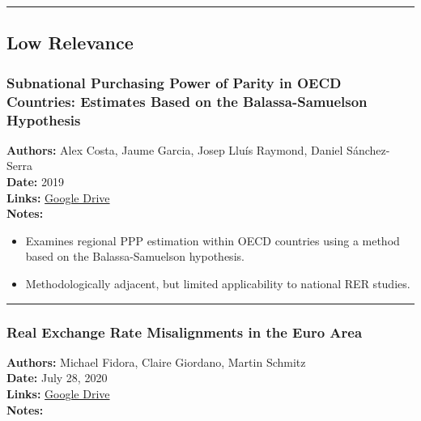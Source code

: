\documentclass[
  11pt,
]{article}
\providecommand{\tightlist}{%
  \setlength{\itemsep}{0pt}\setlength{\parskip}{0pt}}
\begin{document}
\begin{center}\rule{0.5\linewidth}{0.5pt}\end{center}

\subsection{Low Relevance}\label{low-relevance}

\subsubsection{Subnational Purchasing Power of Parity in OECD Countries:
Estimates Based on the Balassa-Samuelson
Hypothesis}\label{subnational-purchasing-power-of-parity-in-oecd-countries-estimates-based-on-the-balassa-samuelson-hypothesis}

\textbf{Authors:} Alex Costa, Jaume Garcia, Josep Lluís Raymond, Daniel
Sánchez-Serra\\
\textbf{Date:} 2019\\
\textbf{Links:}
\href{https://drive.google.com/file/d/1QT0iR2TwIY5ayraL7pAe0Ir_R03U17nR/view?usp=sharing}{Google
Drive}\\
\textbf{Notes:}

\begin{itemize}
\tightlist
\item
  Examines regional PPP estimation within OECD countries using a method
  based on the Balassa-Samuelson hypothesis.
\item
  Methodologically adjacent, but limited applicability to national RER
  studies.
\end{itemize}

\begin{center}\rule{0.5\linewidth}{0.5pt}\end{center}

\subsubsection{Real Exchange Rate Misalignments in the Euro
Area}\label{real-exchange-rate-misalignments-in-the-euro-area}

\textbf{Authors:} Michael Fidora, Claire Giordano, Martin Schmitz\\
\textbf{Date:} July 28, 2020\\
\textbf{Links:}
\href{https://drive.google.com/file/d/1r1e4j018-tVvMPwVqttye_ftEfZTTNsj/view?usp=sharing}{Google
Drive}\\
\textbf{Notes:}
\end{document}
